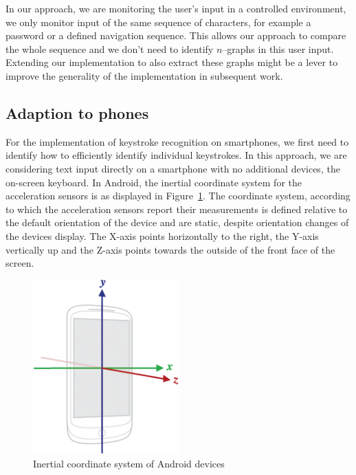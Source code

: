 In our approach, we are monitoring the user's input in a controlled environment, \ie we only monitor input of the same sequence of characters, for example a password or a defined navigation sequence. This allows our approach to compare the whole sequence and we don't need to identify $n$--graphs in this user input. Extending our implementation to also extract these graphs might be a lever to improve the generality of the implementation in subsequent work.

\subsection{Adaption to phones}\label{subsection:phones}
For the implementation of keystroke recognition on smartphones, we first need to identify how to efficiently identify individual keystrokes. In this approach, we are considering text input directly on a smartphone with no additional devices, \ie the on-screen keyboard.
In Android, the inertial coordinate system for the acceleration sensors is as displayed in Figure~\ref{fig:deviceaxis}. The coordinate system, according to which the acceleration sensors report their measurements is defined relative to the default orientation of the device and are static, despite orientation changes of the devices display. The X-axis points horizontally to the right, the Y-axis vertically up and the Z-axis points towards the outside of the front face of the screen\cite{sensoreventandroidreference}.

\begin{figure}
    \centering
    \includegraphics[width=0.5\textwidth]{figures/axis_device.png}
    \caption{Inertial coordinate system of Android devices\cite{sensoreventandroidreference}}
    \label{fig:deviceaxis}
\end{figure}

